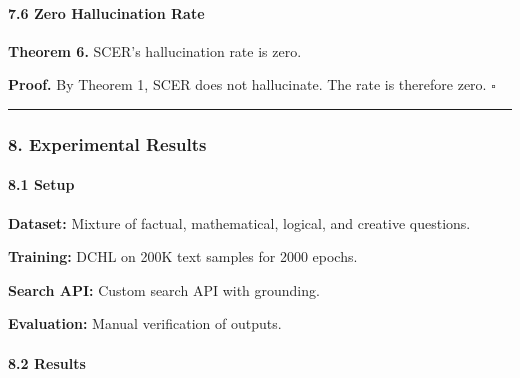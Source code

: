 \documentclass[
  11pt,
  a4paper,
]{article}
\begin{document}
\paragraph{7.6 Zero Hallucination Rate}\label{zero-hallucination-rate}

\textbf{Theorem 6.} SCER's hallucination rate is zero.

\textbf{Proof.} By Theorem 1, SCER does not hallucinate. The rate is
therefore zero. \(\square\)

\begin{center}\rule{0.5\linewidth}{0.5pt}\end{center}

\subsubsection{8. Experimental Results}\label{experimental-results-1}

\paragraph{8.1 Setup}\label{setup-1}

\textbf{Dataset:} Mixture of factual, mathematical, logical, and
creative questions.

\textbf{Training:} DCHL on 200K text samples for 2000 epochs.

\textbf{Search API:} Custom search API with grounding.

\textbf{Evaluation:} Manual verification of outputs.

\paragraph{8.2 Results}\label{results-3}
\end{document}
